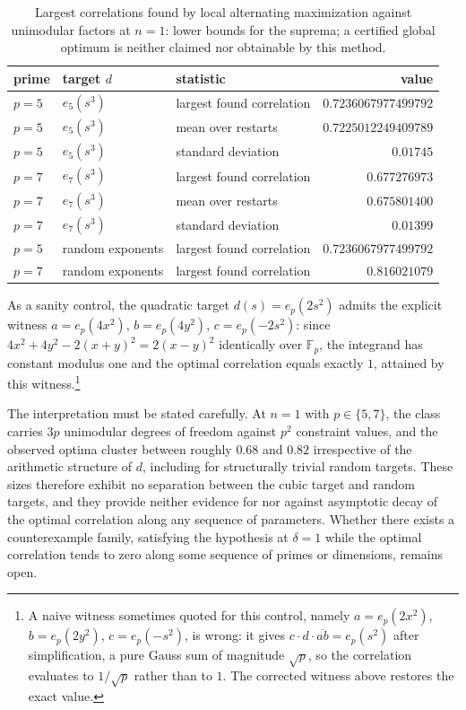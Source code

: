\documentclass[11pt]{article}
\theoremstyle{remark}
\begin{document}
\begin{table}[ht]
\centering
\small
\begin{tabular}{lllr}
\toprule
prime & target $d$ & statistic & value \\
\midrule
$p=5$ & $e_5(s^{3})$ & largest found correlation  & $0.7236067977499792$ \\
$p=5$ & $e_5(s^{3})$ & mean over restarts & $0.7225012249409789$ \\
$p=5$ & $e_5(s^{3})$ & standard deviation & $0.01745$ \\
$p=7$ & $e_7(s^{3})$ & largest found correlation  & $0.677276973$ \\
$p=7$ & $e_7(s^{3})$ & mean over restarts & $0.675801400$ \\
$p=7$ & $e_7(s^{3})$ & standard deviation & $0.01399$ \\
\midrule
$p=5$ & random exponents & largest found correlation & $0.7236067977499792$ \\
$p=7$ & random exponents & largest found correlation & $0.816021079$ \\
\bottomrule
\end{tabular}
\caption{Largest correlations found by local alternating maximization against
unimodular factors at $n=1$: lower bounds for the suprema; a certified global
optimum is neither claimed nor obtainable by this method.}
\label{tab:exp}
\end{table}

As a sanity control, the quadratic target $d(s)=e_p(2s^{2})$ admits the
explicit witness $a=e_p(4x^{2})$, $b=e_p(4y^{2})$, $c=e_p(-2s^{2})$: since
$4x^{2}+4y^{2}-2(x+y)^{2}=2(x-y)^{2}$ identically over $\mathbb{F}_p$, the
integrand has constant modulus one and the optimal correlation equals
exactly $1$, attained by this witness.\footnote{A naive witness sometimes
quoted for this control, namely $a=e_p(2x^{2})$, $b=e_p(2y^{2})$,
$c=e_p(-s^{2})$, is wrong: it gives
$c\cdot d\cdot\overline{ab}=e_p(s^{2})$ after simplification, a pure Gauss
sum of magnitude $\sqrt{p}$, so the correlation evaluates to
$1/\sqrt{p}$ rather than to $1$. The corrected witness above restores the
exact value.}

The interpretation must be stated carefully. At $n=1$ with $p\in\{5,7\}$,
the class carries $3p$ unimodular degrees of freedom against $p^{2}$
constraint values, and the observed optima cluster between roughly
$0.68$ and $0.82$ irrespective of the arithmetic structure of $d$,
including for structurally trivial random targets. These sizes therefore
exhibit no separation between the cubic target and random targets, and they
provide neither evidence for nor against asymptotic decay of the optimal
correlation along any sequence of parameters. Whether there exists a
counterexample family, satisfying the hypothesis at $\delta=1$ while the
optimal correlation tends to zero along some sequence of primes or
dimensions, remains open.
\end{document}

